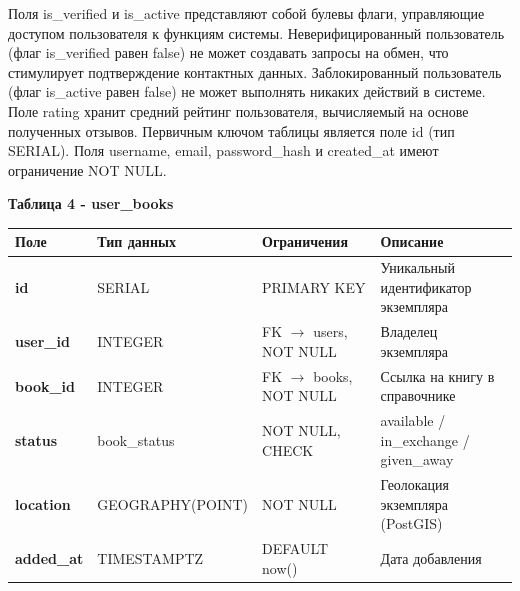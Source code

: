 \documentclass[14pt,a4paper]{extarticle}
\begin{document}
Поля is\_verified и is\_active представляют собой булевы флаги,
управляющие доступом пользователя к функциям системы. Неверифицированный
пользователь (флаг is\_verified равен false) не может создавать запросы
на обмен, что стимулирует подтверждение контактных данных.
Заблокированный пользователь (флаг is\_active равен false) не может
выполнять никаких действий в системе. Поле rating хранит средний рейтинг
пользователя, вычисляемый на основе полученных отзывов. Первичным ключом
таблицы является поле id (тип SERIAL). Поля username, email,
password\_hash и created\_at имеют ограничение NOT NULL.

\textbf{Таблица 4 - user\_books}


\begin{longtable}[]{@{}
  >{\centering\arraybackslash}p{}
  >{\centering\arraybackslash}p{}
  >{\centering\arraybackslash}p{}
  >{\centering\arraybackslash}p{}@{}}
\toprule\noalign{}
\begin{minipage}[b]{\linewidth}\centering
\textbf{Поле}
\end{minipage} & \begin{minipage}[b]{\linewidth}\centering
\textbf{Тип данных}
\end{minipage} & \begin{minipage}[b]{\linewidth}\centering
\textbf{Ограничения}
\end{minipage} & \begin{minipage}[b]{\linewidth}\centering
\textbf{Описание}
\end{minipage} \\
\midrule\noalign{}
\endhead
\bottomrule\noalign{}
\endlastfoot
\textbf{id} & SERIAL & PRIMARY KEY & Уникальный идентификатор
экземпляра \\
\textbf{user\_id} & INTEGER & FK $\rightarrow$ users, NOT NULL & Владелец
экземпляра \\
\textbf{book\_id} & INTEGER & FK $\rightarrow$ books, NOT NULL & Ссылка на книгу в
справочнике \\
\textbf{status} & book\_status & NOT NULL, CHECK & available /
in\_exchange / given\_away \\
\textbf{location} & GEOGRAPHY(POINT) & NOT NULL & Геолокация экземпляра
(PostGIS) \\
\textbf{added\_at} & TIMESTAMPTZ & DEFAULT now() & Дата добавления \\
\end{longtable}
\end{document}
